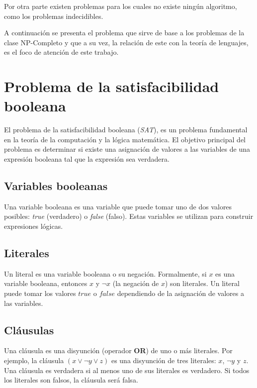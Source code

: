 \documentclass[12pt]{article}
\begin{document}
Por otra parte existen problemas para los cuales no existe ningún algoritmo, como los problemas indecidibles.

A continuación se presenta el problema que sirve de base a los problemas de la clase NP-Completo y que a su
vez, la relación de este con la teoría de lenguajes, es el foco de atención de este trabajo.

\section{Problema de la satisfacibilidad booleana}

El problema de la satisfacibilidad booleana (\textit{SAT}), es un problema fundamental en la teoría de la computación y la lógica matemática. El objetivo principal del problema es determinar si existe una asignación de valores a las variables de una expresión booleana tal que la expresión sea verdadera.

\subsection{Variables booleanas}

Una variable booleana es una variable que puede tomar uno de dos valores posibles: \textit{true} (verdadero) o \textit{false} (falso). Estas variables se utilizan para construir expresiones lógicas.

\subsection{Literales}

Un literal es una variable booleana o su negación. Formalmente, si \( x \) es una variable booleana, entonces \( x \) y \( \neg x \) (la negación de \( x \)) son literales. Un literal puede tomar los valores \( true \) o \( false \) dependiendo de la asignación de valores a las variables.

\subsection{Cláusulas}

Una cláusula es una disyunción (operador \textbf{OR}) de uno o más literales. Por ejemplo, la cláusula \( (x \vee \neg y \vee z) \) es una disyunción de tres literales: \( x \), \( \neg y \) y \( z \). Una cláusula es verdadera si al menos uno de sus literales es verdadero. Si todos los literales son falsos, la cláusula será falsa.
\end{document}
